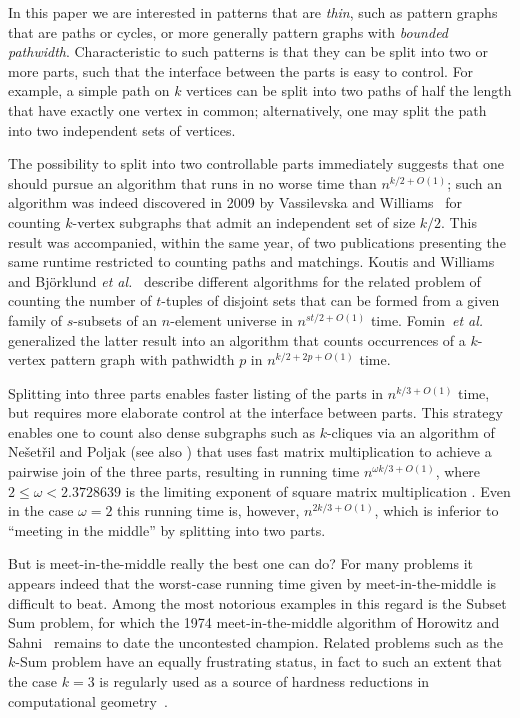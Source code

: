 \documentclass{amsart}
\begin{document}
In this paper we are interested in patterns that are {\em thin}, such 
as pattern graphs that are paths or cycles, or more generally pattern graphs 
with {\em bounded pathwidth}. Characteristic to such patterns is 
that they can be split into two or more parts, such that the interface 
between the parts is easy to control. For example, a simple path on $k$ 
vertices can be split into two paths of half the length that have exactly 
one vertex in common; alternatively, one may split the path into 
two independent sets of vertices.

The possibility to split into two controllable parts immediately suggests 
that one should pursue an algorithm that runs in no worse 
time than $n^{k/2+O(1)}$; such an algorithm was indeed 
discovered in 2009 by Vassilevska and Williams~\cite{VW09} for 
counting $k$-vertex subgraphs that admit an independent set of size $k/2$.
This result was accompanied, within the same year, of two publications 
presenting the same runtime restricted to counting paths and matchings. Koutis 
and Williams~\cite{KW09} and Bj\"orklund \emph{et al.}~\cite{BHKK09} 
describe different algorithms for the related problem of counting 
the number of $t$-tuples of disjoint sets that can be formed from
a given family of $s$-subsets of an $n$-element universe in 
$n^{st/2+O(1)}$ time. Fomin~\emph{et al.}~\cite{FLRRS12} 
generalized the latter result into an algorithm that counts occurrences 
of a $k$-vertex pattern graph with pathwidth $p$ in $n^{k/2+2p+O(1)}$ time.

Splitting into three parts enables faster listing of the parts in 
$n^{k/3+O(1)}$ time, but requires more elaborate control at the interface 
between parts. This strategy enables one to count also dense subgraphs
such as $k$-cliques via an algorithm of Ne\v{s}et\v{r}il and 
Poljak \cite{NP85} (see also \cite{EG04,KKM00}) that uses fast
matrix multiplication to achieve a pairwise join of the three parts, 
resulting in running time $n^{\omega k/3+O(1)}$, where 
$2\leq\omega< 2.3728639$ is the limiting exponent of square matrix 
multiplication \cite{LG14,VW12}.
Even in the case $\omega=2$ this running time is, however, 
$n^{2k/3+O(1)}$, which is inferior to ``meeting in the middle'' by 
splitting into two parts.

But is meet-in-the-middle really the best one can do?
For many problems it appears indeed that the worst-case running time given 
by meet-in-the-middle is difficult to beat. Among the most notorious examples 
in this regard is the Subset Sum problem, for which the 1974 
meet-in-the-middle algorithm of Horowitz and Sahni~\cite{HS74} remains to 
date the uncontested champion. Related problems such as the $k$-Sum problem 
have an equally frustrating status, in fact to such an extent that the 
case $k=3$ is regularly used as a source of hardness reductions in 
computational geometry~\cite{GO12}.
\end{document}

